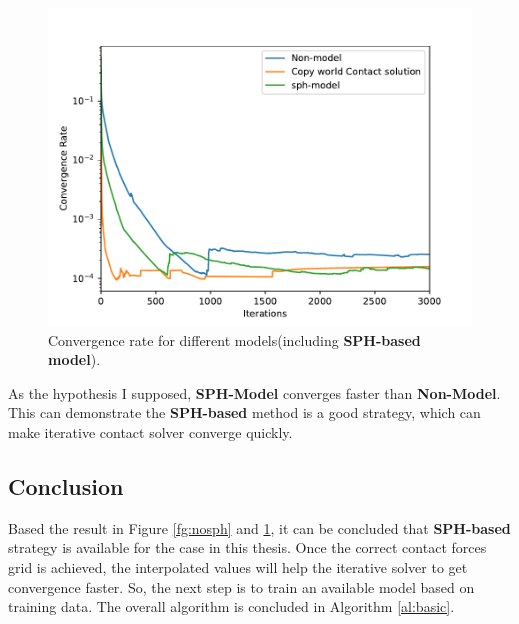     \begin{figure}[!h]
        \centering
        \includegraphics[width=\textwidth]{Figures/addsph}
        \caption{Convergence rate for different models(including \textbf{SPH-based model}).}
        \label{fg:addsph}
    \end{figure}
    As the hypothesis I supposed, \textbf{SPH-Model} converges faster than \textbf{Non-Model}. This can demonstrate the \textbf{SPH-based} method is a good strategy, which can make iterative contact solver converge quickly.

\subsection{Conclusion}
    Based the result in Figure \ref{fg:nosph} and \ref{fg:addsph}, it can be concluded that \textbf{SPH-based} strategy is available for the case in this thesis. Once the correct contact forces grid is achieved, the interpolated values will help the iterative solver to get convergence faster. So, the next step is to train an available model based on training data. The overall algorithm is concluded in Algorithm \ref{al:basic}.